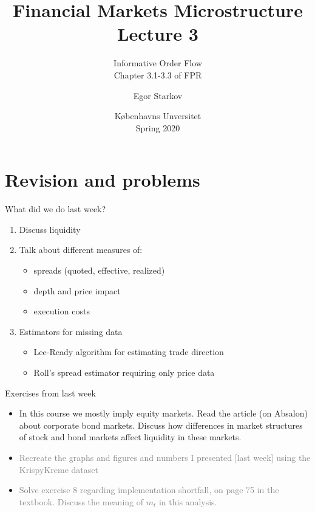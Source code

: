 \documentclass[english,10pt]{beamer}
\title{Financial Markets Microstructure \\ Lecture 3}
\subtitle{Informative Order Flow\\
	Chapter 3.1-3.3 of FPR}
\author{Egor Starkov}
\date{K{\o}benhavns Unversitet \\
	Spring 2020}
\begin{document}
	\frame[plain]{\titlepage}
	\addtocounter{framenumber}{-1}

\section{Revision and problems}

\begin{frame}{What did we do last week?}
\begin{enumerate}
	\item Discuss liquidity
	\item Talk about different measures of:
	\begin{itemize}
		\item spreads (quoted, effective, realized)
		\item depth and price impact
		\item execution costs
	\end{itemize}
	\item Estimators for missing data
	\begin{itemize}
		\item Lee-Ready algorithm for estimating trade direction
		\item Roll's spread estimator requiring only price data
	\end{itemize}
\end{enumerate}
\end{frame}


\begin{frame}{Exercises from last week}
	\begin{itemize}
		\item In this course we mostly imply equity markets. Read the article (on Absalon) about corporate bond markets. Discuss how differences in market structures of stock and bond markets affect liquidity in these markets.
		\item \textcolor{gray}{Recreate the graphs and figures and numbers I presented [last week] using the KrispyKreme dataset}
		\item \textcolor{gray}{Solve exercise 8 regarding implementation shortfall, on page 75 in the textbook.
		Discuss the meaning of $m_t$ in this analysis.}
	\end{itemize}
\end{frame}
\end{document}
